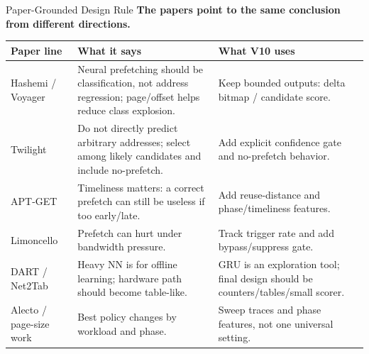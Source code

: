 \documentclass[10pt,aspectratio=169]{beamer}
\begin{document}
\begin{frame}{Paper-Grounded Design Rule}
  \textbf{The papers point to the same conclusion from different directions.}

  \vspace{0.3em}
  \begin{center}
  \footnotesize
  \begin{tabular}{p{3.0cm}p{4.7cm}p{5.3cm}}
    \toprule
    \textbf{Paper line} & \textbf{What it says} & \textbf{What V10 uses} \\
    \midrule
    Hashemi / Voyager & Neural prefetching should be classification, not address regression; page/offset helps reduce class explosion. & Keep bounded outputs: delta bitmap / candidate score. \\
    Twilight & Do not directly predict arbitrary addresses; select among likely candidates and include no-prefetch. & Add explicit confidence gate and no-prefetch behavior. \\
    APT-GET & Timeliness matters: a correct prefetch can still be useless if too early/late. & Add reuse-distance and phase/timeliness features. \\
    Limoncello & Prefetch can hurt under bandwidth pressure. & Track trigger rate and add bypass/suppress gate. \\
    DART / Net2Tab & Heavy NN is for offline learning; hardware path should become table-like. & GRU is an exploration tool; final design should be counters/tables/small scorer. \\
    Alecto / page-size work & Best policy changes by workload and phase. & Sweep traces and phase features, not one universal setting. \\
    \bottomrule
  \end{tabular}
  \end{center}
\end{frame}
\end{document}
